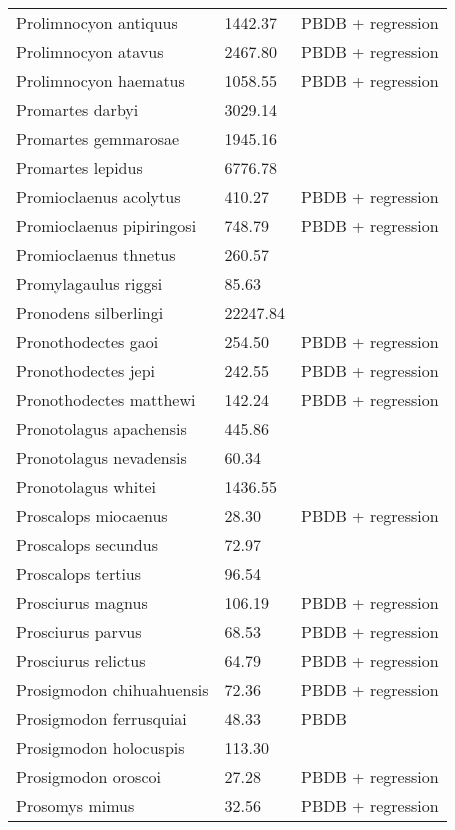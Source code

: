 \begin{center}
\begin{longtable}{p{} p{} p{} }
  Prolimnocyon antiquus & 1442.37 & PBDB + regression \\ 
  Prolimnocyon atavus & 2467.80 & PBDB + regression \\ 
  Prolimnocyon haematus & 1058.55 & PBDB + regression \\ 
  Promartes darbyi & 3029.14 & \cite{Dawson2007} \\ 
  Promartes gemmarosae & 1945.16 & \cite{Dawson2007} \\ 
  Promartes lepidus & 6776.78 & \cite{Mora2005} \\ 
  Promioclaenus acolytus & 410.27 & PBDB + regression \\ 
  Promioclaenus pipiringosi & 748.79 & PBDB + regression \\ 
  Promioclaenus thnetus & 260.57 & \cite{Gazin1930} \\ 
  Promylagaulus riggsi & 85.63 & \cite{Tomiya2013} \\ 
  Pronodens silberlingi & 22247.84 & \cite{Tomiya2013} \\ 
  Pronothodectes gaoi & 254.50 & PBDB + regression \\ 
  Pronothodectes jepi & 242.55 & PBDB + regression \\ 
  Pronothodectes matthewi & 142.24 & PBDB + regression \\ 
  Pronotolagus apachensis & 445.86 & \cite{Tomiya2013} \\ 
  Pronotolagus nevadensis & 60.34 & \cite{Tomiya2013} \\ 
  Pronotolagus whitei & 1436.55 & \cite{Tomiya2013} \\ 
  Proscalops miocaenus & 28.30 & PBDB + regression \\ 
  Proscalops secundus & 72.97 & \cite{Tomiya2013} \\ 
  Proscalops tertius & 96.54 & \cite{Tomiya2013} \\ 
  Prosciurus magnus & 106.19 & PBDB + regression \\ 
  Prosciurus parvus & 68.53 & PBDB + regression \\ 
  Prosciurus relictus & 64.79 & PBDB + regression \\ 
  Prosigmodon chihuahuensis & 72.36 & PBDB + regression \\ 
  Prosigmodon ferrusquiai & 48.33 & PBDB \\ 
  Prosigmodon holocuspis & 113.30 & \cite{Tomiya2013} \\ 
  Prosigmodon oroscoi & 27.28 & PBDB + regression \\ 
  Prosomys mimus & 32.56 & PBDB + regression \\ 

\end{longtable}
\end{center}
